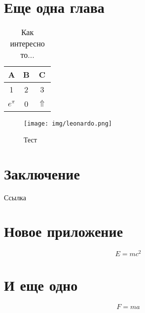 \documentclass[12pt, rusmathsym]{nirreport}
\begin{document}
\chapter{Еще одна глава}

\lipsum[1]

\begin{table}[!ht]
  \caption{Как интересно то...}
  \centering
  \begin{tabular}{ccc} \hline
    A           & B & C            \\ \hline
    1           & 2 & 3            \\
    \(e^{\pi}\) & 0 & \(\Uparrow\) \\ \hline
  \end{tabular}
\end{table}

\lipsum[1]

\begin{figure}[!ht]
  \begin{center}
    \texttt{[image: img/leonardo.png]}
  \end{center}
  \caption{Тест}
\end{figure}

\chapter*{Заключение}

Ссылка~\cite{Pup09}

\lipsum[1]

% 
% 
\printbibliography

\appendix

\chapter{Новое приложение}

\[ E = m c^2 \]

\chapter{И еще одно}

\[ F = m a \]
\end{document}
